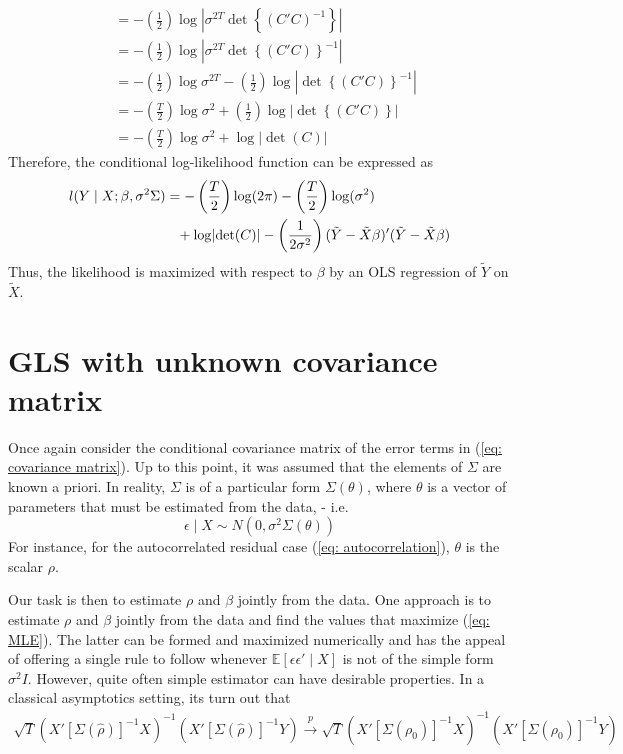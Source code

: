 \documentclass[10pt,handout,english]{beamer}
\newcommand{\E}{\mathbb{E}}
\begin{document}
\begin{frame}[allowframebreaks]
\begin{align*}
&=-\left(\frac{1}{2}\right)\log\left\lvert\sigma^{2T}\det\left\{\left(C'C \right)^{-1}\right\}\right\rvert\\
&=-\left(\frac{1}{2}\right)\log\left\lvert\sigma^{2T}\det\left\{\left(C'C \right)\right\}^{-1}\right\rvert\\
&=-\left(\frac{1}{2}\right)\log\sigma^{2T}-\left(\frac{1}{2}\right)\log\left\lvert\det\left\{\left(C'C \right)\right\}^{-1}\right\rvert\\
&=-\left(\frac{T}{2}\right)\log\sigma^{2}+\left(\frac{1}{2}\right)\log\left\lvert\det\left\{\left(C'C \right)\right\}\right\rvert\\
&=-\left(\frac{T}{2}\right)\log\sigma^{2}+\log\left\lvert\det\left(C \right)\right\rvert
\end{align*}
\endgroup
Therefore, the conditional log-likelihood function can be expressed as
\begingroup
\allowdisplaybreaks
\begin{align}\label{eq: MLE}
l(Y\mid X;\beta,\sigma^2\Sigma)&=-\left(\frac{T}{2}\right)\log(2\pi)-\left(\frac{T}{2}\right)\log(\sigma^2)\\
&\textcolor{white}{=}+\log\lvert\det(C)\rvert-\left(\frac{1}{2\sigma^2}\right)(\tilde{Y}-\tilde{X}\beta)'(\tilde{Y}-\tilde{X}\beta)
\end{align}
\endgroup
Thus, the likelihood is maximized with respect to $\beta$ by an OLS regression of $\tilde{Y}$ on $\tilde{X}$.
\end{frame}
\section{GLS with unknown covariance matrix}
\begin{frame}
Once again consider the conditional covariance matrix of the error terms in (\ref{eq: covariance matrix}). Up to this point, it was assumed that the elements of $\Sigma$ are known a priori. In reality, $\Sigma$ is of a particular form $\Sigma(\theta)$, where $\theta$ is a vector of parameters that must be estimated from the data, - i.e.
\[
\epsilon\mid X\sim N(0,\sigma^2\Sigma(\theta))
\]
For instance, for the autocorrelated residual case (\ref{eq: autocorrelation}), $\theta$ is the scalar $\rho$.

Our task is then to estimate $\rho$ and $\beta$ jointly from the data. One approach is to estimate $\rho$ and $\beta$ jointly from the data and find the values that maximize (\ref{eq: MLE}). The latter can be formed and maximized numerically and has the appeal of offering a single rule to follow whenever $\E[\epsilon\epsilon'\mid X]$ is not of the simple form $\sigma^2 I$. However, quite often simple estimator can have desirable properties. In a classical asymptotics setting, its turn out that
\begin{align*}
\sqrt{T}(X'[\Sigma(\hat{\rho})]^{-1}X)^{-1}(X'[\Sigma(\hat{\rho})]^{-1}Y)\overset{p}{\to}\sqrt{T}(X'[\Sigma(\rho_0)]^{-1}X)^{-1}(X'[\Sigma(\rho_0)]^{-1}Y)
\end{align*}
\end{frame}
\end{document}
